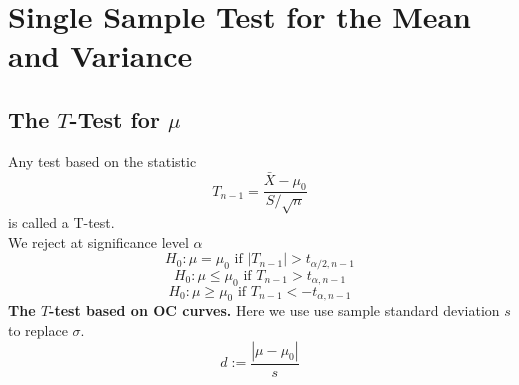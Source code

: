 \documentclass[a4paper,12pt]{article}
\begin{document}
\section{Single Sample Test for the Mean and Variance}
\subsection{The $T$-Test for $\mu$}
Any test based on the statistic
\begin{equation}
T_{n-1}=\frac{\bar{X}-\mu_0}{S / \sqrt{n}}
\end{equation}
is called a T-test.\\
We reject at significance level $\alpha$
$$H_0: \mu=\mu_0 \text{ if } \left|T_{n-1}\right|>t_{\alpha / 2, n-1}$$
$$H_0: \mu \leq \mu_0 \text{ if } T_{n-1}>t_{\alpha, n-1}$$
$$H_0: \mu \geq \mu_0 \text{ if } T_{n-1}<-t_{\alpha, n-1}$$
\textbf{The $T$-test based on OC curves.} Here we use use sample standard deviation $s$ to replace $\sigma$. 
\begin{equation}
    d:=\dfrac{|\mu-\mu_0|}{s}
\end{equation}
\end{document}
